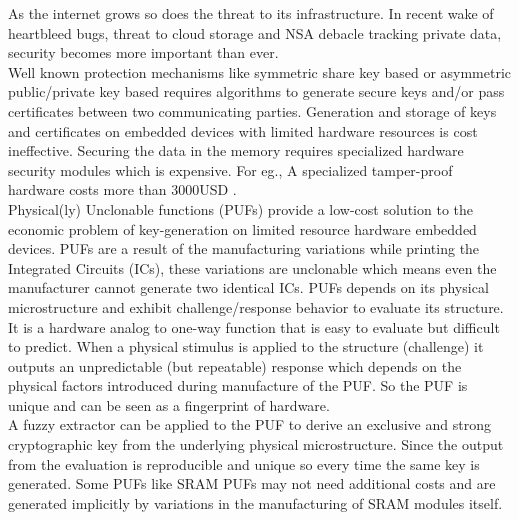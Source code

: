 As the internet grows so does the threat to its infrastructure.
In recent wake of heartbleed bugs, threat to cloud storage and NSA debacle tracking private data, security becomes more important than ever.\\

Well known protection mechanisms like symmetric share key based or asymmetric public/private key based requires algorithms to generate secure keys and/or pass certificates between two communicating parties. Generation and storage of keys and certificates on embedded devices with limited hardware resources is cost ineffective. Securing the data in the memory requires specialized hardware security modules which is expensive. For eg., A specialized tamper-proof hardware costs more than 3000USD
\cite{os8}.\\

Physical(ly) Unclonable functions (PUFs) \cite{os9} provide a low-cost solution to the economic problem of key-generation on limited resource hardware embedded devices. PUFs are a result of the manufacturing variations while printing the Integrated Circuits (ICs), these variations are unclonable which means even the manufacturer cannot generate two identical ICs. PUFs depends on its physical microstructure and exhibit challenge/response behavior to evaluate its structure. It is a hardware analog to
one-way function that is easy to evaluate but difficult to predict. When a physical stimulus is applied to the structure (challenge) it outputs an unpredictable (but repeatable) response which depends on the physical factors introduced during manufacture of the PUF. So the PUF is unique and can be seen as a fingerprint of hardware\cite{15}.\\

A fuzzy extractor \cite{fuzzy} can be applied to the PUF to derive an exclusive and strong cryptographic key from the underlying physical microstructure. Since the output from the evaluation is reproducible and unique so every time the same key is generated. Some PUFs like SRAM PUFs may not need additional costs and are generated implicitly by variations in the manufacturing of SRAM modules itself.\\

